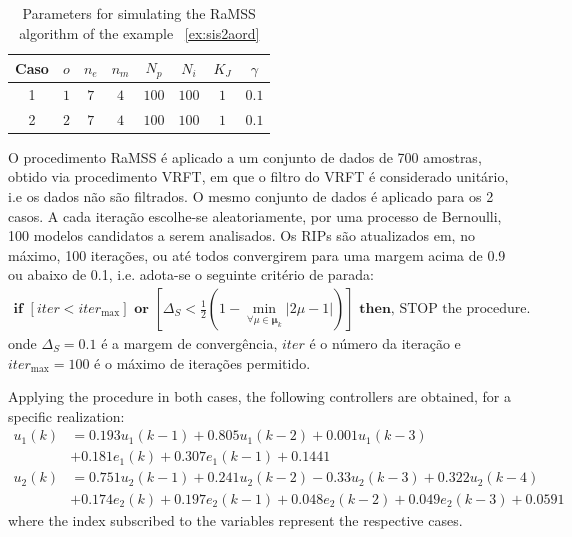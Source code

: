 \begin{exmp}
\begin{table}[htpb]
  \centering
  \caption{Parameters for simulating the RaMSS algorithm of the example ~\ref{ex:sis2aord}}\label{tab:exp51_param}
  \begin{tabular}{c|c|c|c|c|c|c|c}
    Caso & $o$ & $n_e$ & $n_m$ & $N_p$ & $N_i$ & $K_J$ & $\gamma$ \\
    \hline
    1 & $ 1 $ & $7$ & $4$ & $100$ & $100$ & $1$ & $0.1$ \\
    2 & $ 2 $ & $7$ & $4$ & $100$ & $100$ & $1$ & $0.1$
  \end{tabular}
\end{table}

O procedimento RaMSS é aplicado a um conjunto de dados de 700 amostras, obtido via procedimento VRFT, em que o filtro do VRFT é considerado unitário, i.e os dados não são filtrados. O mesmo conjunto de dados é aplicado para os 2 casos. A cada iteração escolhe-se aleatoriamente, por uma processo de Bernoulli, 100 modelos candidatos a serem analisados. Os RIPs são atualizados em, no máximo, 100 iterações, ou até todos convergirem para uma margem acima de 0.9 ou abaixo de 0.1, i.e. adota-se o seguinte critério de parada:
\begin{align}
  \textbf{if } \left[iter<iter_{\max}\right] \textbf{ or } \left[\Delta_S < \frac{1}{2} \left(1-\min_{\forall \mu \in \bm{\mu}_k}{ \left| 2\mu -1 \right| }\right)\right] \textbf{ then} \text{, STOP the procedure.}
\label{eq:}
\end{align}
onde $\Delta_S = 0.1$ é a margem de convergência, $iter$ é o número da iteração e $iter_{\max} = 100$ é o máximo de iterações permitido. 


Applying the procedure in both cases, the following controllers are obtained, for a specific realization:
\begin{align*}
  u_1(k) &= 0.193{u}_1(k-1) + 0.805{u}_1(k-2) + 0.001{u}_1(k-3) \\
         &+ 0.181{e}_1(k) + 0.307{e}_1(k-1) + 0.1441 \\
  u_2(k) &= 0.751{u}_2(k-1) + 0.241{u}_2(k-2) -0.33{u}_2(k-3) + 0.322{u}_2(k-4) \\
         &+ 0.174{e}_2(k) + 0.197{e}_2(k-1) + 0.048{e}_2(k-2) + 0.049{e}_2(k-3) + 0.0591
\end{align*}
where the index subscribed to the variables represent the respective cases.


\end{exmp}
